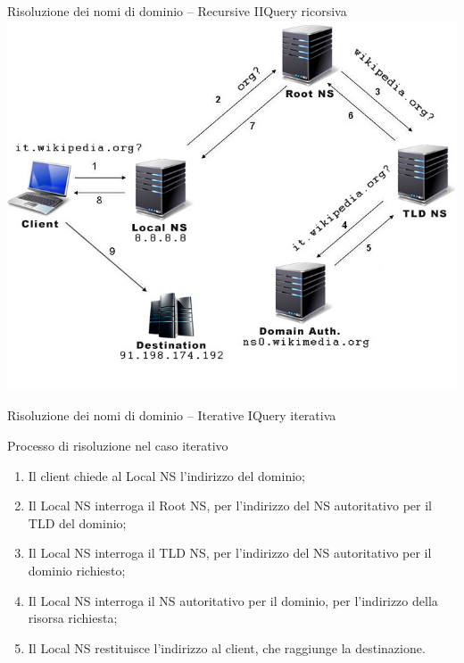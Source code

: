 \documentclass[italian]{beamer}
\begin{document}
\begin{frame}{Risoluzione dei nomi di dominio -- Recursive II}{Query ricorsiva}
\centering\includegraphics[height=0.8\textheight]{img/dns-risoluzione-ricorsiva}
\end{frame}

\begin{frame}{Risoluzione dei nomi di dominio -- Iterative I}{Query iterativa}
\begin{block}{Processo di risoluzione nel caso iterativo}
\begin{enumerate}
\item Il client chiede al Local NS l'indirizzo del dominio;
\item Il Local NS interroga il Root NS, per l'indirizzo del NS autoritativo per il TLD del dominio;
\item Il Local NS interroga il TLD NS, per l'indirizzo del NS autoritativo per il dominio richiesto;
\item Il Local NS interroga il NS autoritativo per il dominio, per l'indirizzo della risorsa richiesta;
\item Il Local NS restituisce l'indirizzo al client, che raggiunge la destinazione.
\end{enumerate}
\end{block}
\end{frame}
\end{document}
